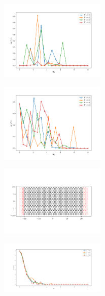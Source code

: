 \documentclass[11pt, a4paper, twocolumn]{article}
\begin{document}
\begin{figure}[H]
  \begin{center}
  \includegraphics[width=0.45\textwidth]{./media/transmission_square_lat_phi=0dot0.png}
  \caption{}
  \label{fig:transmission_square_lat_phi_0dot0}
  \end{center}
\end{figure}

\begin{figure}[H]
  \begin{center}
  \includegraphics[width=0.45\textwidth]{./media/transmission_square_lat_phi=0dot2.png}
  \caption{}
  \label{fig:transmission_square_lat_phi_0dot2.png}
  \end{center}
\end{figure}

\begin{figure}[H]
  \begin{center}
  \includegraphics[width=0.45\textwidth]{./media/graphene_lattice_W=20_L=40.png}
  \caption{}
  \label{fig:graphene_lattice_W_20_L_40.png}
  \end{center}
\end{figure}

\begin{figure}[H]
  \begin{center}
  \includegraphics[width=0.45\textwidth]{./media/transmission_graphene_lat_phi=0dot0Wmax=5.png}
  \caption{}
  \label{fig:transmission_graphene_lat_phi_0dot0Wmax_5.png}
  \end{center}
\end{figure}
\end{document}
